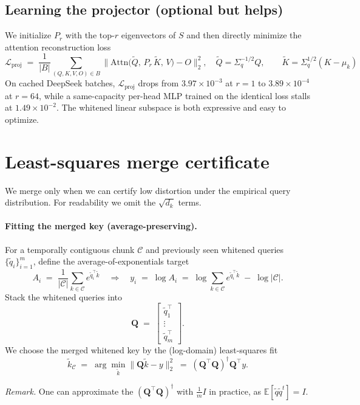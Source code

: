 \documentclass[11pt]{article}
\newcommand{\E}{\mathbb{E}}
\begin{document}
\subsection*{Learning the projector (optional but helps)}
We initialize $P_r$ with the top-$r$ eigenvectors of $S$ and then directly minimize the attention reconstruction loss
\[
\mathcal{L}_{\text{proj}} \;=\; \frac{1}{|B|}\!
\sum_{(Q,K,V,O)\in B}\big\|\mathrm{Attn}\!\big(\tilde Q,\,P_r\,\tilde K,\,V\big)-O\big\|_2^2,
\quad \tilde Q=\Sigma_q^{-1/2}Q,\qquad \tilde K=\Sigma_q^{1/2}(K-\mu_k)
\]
On cached DeepSeek batches, $\mathcal{L}_{\text{proj}}$ drops from $3.97\!\times\!10^{-3}$ at $r{=}1$ to $3.89\!\times\!10^{-4}$ at $r{=}64$, while a same-capacity per-head MLP trained on the identical loss stalls at $1.49\!\times\!10^{-2}$. The whitened linear subspace is both expressive and easy to optimize.

\section*{Least-squares merge certificate}
We merge only when we can certify low distortion under the empirical query distribution. For readability we omit the $\sqrt{d_k}$ terms.

\paragraph{Fitting the merged key (average-preserving).}
For a temporally contiguous chunk $\mathcal{C}$ and previously seen whitened queries $\{\tilde q_i\}_{i=1}^m$, define the average-of-exponentials target
\[
A_i \;=\; \frac{1}{|\mathcal{C}|}\sum_{k\in\mathcal{C}} e^{\tilde q_i^\top \tilde k}
\quad\Longrightarrow\quad
y_i \;=\; \log A_i \;=\; \log\!\sum_{k\in\mathcal{C}} e^{\tilde q_i^\top \tilde k} \;-\; \log|\mathcal{C}|.
\]
Stack the whitened queries into
\[
\mathbf{Q} \;=\;
\begin{bmatrix}
\tilde q_1^\top\\[-1pt]\vdots\\[-1pt]\tilde q_m^\top
\end{bmatrix}.
\]
We choose the merged whitened key by the (log-domain) least-squares fit
\[
\tilde k_\mathcal{C}
\;=\;\arg\min_{\tilde k}\big\|\mathbf{Q}\tilde k - y\big\|_2^2
\;=\;(\mathbf{Q}^\top\!\mathbf{Q})^{\dagger}\mathbf{Q}^\top y.
\]

\noindent \textit{Remark.} One can approximate the $(\mathbf{Q}^\top\!\mathbf{Q})^{\dagger}$ with $\frac 1m I$ in practice, as $\E [\tilde q \tilde q^t] = I$. 
\end{document}
